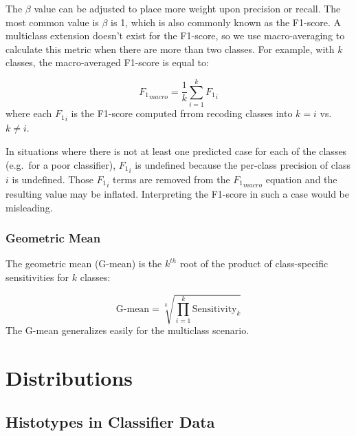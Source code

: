 \documentclass[
]{report}
\begin{document}
The \(\beta\) value can be adjusted to place more weight upon precision or recall. The most common value is \(\beta\) is 1, which is also commonly known as the F1-score. A multiclass extension doesn't exist for the F1-score, so we use macro-averaging to calculate this metric when there are more than two classes. For example, with \(k\) classes, the macro-averaged F1-score is equal to:

\[
{F_1}_{macro} = \frac{1}{k} \sum_{i=1}^{k}{F_1}_{i}
\label{eq:f1-macro}
\]
where each \({F_1}_{i}\) is the F1-score computed frrom recoding classes into \(k=i\) vs.~\(k \neq i\).

In situations where there is not at least one predicted case for each of the classes (e.g.~for a poor classifier), \({F_1}_{i}\) is undefined because the per-class precision of class \(i\) is undefined. Those \({F_1}_{i}\) terms are removed from the \({F_1}_{macro}\) equation and the resulting value may be inflated. Interpreting the F1-score in such a case would be misleading.

\hypertarget{geometric-mean}{%
\subsection{Geometric Mean}\label{geometric-mean}}

The geometric mean (G-mean) is the \(k^{th}\) root of the product of class-specific sensitivities for \(k\) classes:

\[
\text{G-mean} = \sqrt[k]{\prod_{i=1}^{k}{\text{Sensitivity}_k}}
\label{eq:gmean}
\]
The G-mean generalizes easily for the multiclass scenario.

\hypertarget{distributions}{%
\chapter{Distributions}\label{distributions}}

\hypertarget{histotypes-in-classifier-data}{%
\section{Histotypes in Classifier Data}\label{histotypes-in-classifier-data}}
\end{document}
